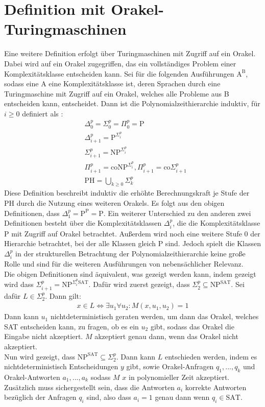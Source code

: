 \section{Definition mit Orakel-Turingmaschinen} \label{section: Definition PH mit Orakel-Turingmaschinen}
Eine weitere Definition erfolgt über Turingmaschinen mit Zugriff auf ein Orakel. Dabei wird auf ein Orakel zugegriffen,
das ein vollständiges Problem einer Komplexitätsklasse entscheiden kann. Sei für die folgenden Ausführungen $\text{A}^\text{B}$, sodass eine A eine Komplexitätsklasse ist, deren Sprachen durch eine Turingmaschine mit Zugriff auf ein Orakel, welches alle Probleme aus B entscheiden kann, entscheidet. 
Dann ist die Polynomialzeithierarchie induktiv, für $i \geq 0$ definiert als \cite{rothe_komplexitatstheorie_2008}:
\begin{align*}
    & \Delta^p_0 = \Sigma^p_0 = \Pi^p_0 = \text{P} \\
    & \Delta^p_{i+1} = \text{P}^{\Sigma^p_i} \\
    &\Sigma^p_{i+1} = \text{NP}^{\Sigma^p_i} \\
    & \Pi^p_{i+1} = \text{coNP}^{\Sigma^p_i}, \Pi^p_{i+1} = \text{co}\Sigma^p_{i+1} \\
    & \text{PH} = \bigcup_{k \geq 0} \Sigma^p_k
\end{align*}
Diese Definition beschreibt induktiv die erhöhte Berechnungskraft je Stufe der PH durch die Nutzung eines weiteren Orakels.
Es folgt aus den obigen Definitionen, dass $\Delta^p_1 = \text{P}^\text{P} = \text{P}$.
Ein weiterer Unterschied zu den anderen zwei Definitionen besteht über die Komplexitätsklassen $\Delta^p_i$, die die Komplexitätsklasse P
mit Zugriff auf Orakel betrachtet. Außerdem wird noch eine weitere Stufe $0$ der Hierarchie betrachtet, bei der alle Klassen gleich P sind.
Jedoch spielt die Klassen $\Delta^p_i$ in der strukturellen Betrachtung der Polynomialzeithierarchie keine große
Rolle und sind für die weiteren Ausführungen von nebensächlicher Relevanz. \\

\noindent Die obigen Definitionen sind äquivalent, was gezeigt werden kann, indem gezeigt wird dass $\Sigma^p_{i+1} = \text{NP}^{\Sigma^p_i \text{SAT}}$.
Dafür wird zuerst gezeigt, dass $\Sigma^p_2 \subseteq \text{NP}^{\text{SAT}}$. Sei dafür $L \in \Sigma^p_2$. Dann gilt: 
\begin{align*}
    x \in L \Leftrightarrow \exists u_1 \forall u_2 : M(x, u_1, u_2) = 1
\end{align*}
Dann kann $u_1$ nichtdeterministisch geraten werden, um dann das Orakel, welches SAT entscheiden kann, zu fragen, ob es ein $u_2$ gibt, sodass das Orakel die Eingabe nicht akzeptiert.
$M$ akzeptiert genau dann, wenn das Orakel nicht akzeptiert. \\
Nun wird gezeigt, dass $\text{NP}^{\text{SAT}} \subseteq \Sigma^p_2 $. Dann kann $L$ entschieden werden, indem es nichtdeterministisch Entscheidungen $y$ gibt, 
sowie Orakel-Anfragen $q_1, ..., q_k$ und Orakel-Antworten $a_1, ..., a_k$ sodass $M$ $x$ in polynomieller Zeit akzeptiert. Zusätzlich muss sichergestellt sein, 
dass die Antworten $a_i$ korrekte Antworten bezüglich der Anfragen $q_i$ sind, also dass $a_i = 1$ genau dann wenn  $q_i \in \text{SAT}$.